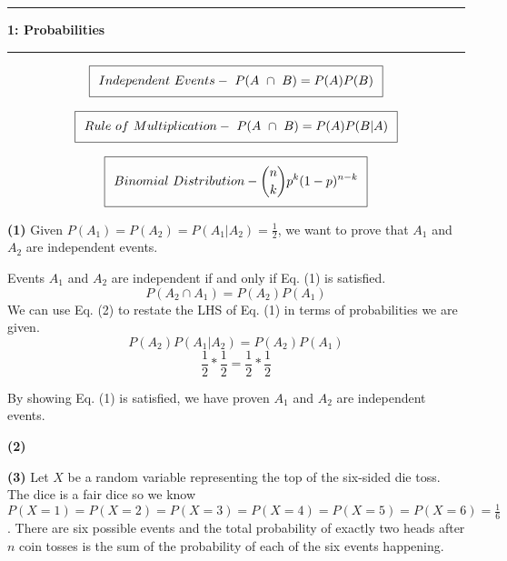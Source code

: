 \documentclass[11pt]{article}
\newcommand\question[2]{\vspace{.25in}\hrule\textbf{#1: #2}\vspace{.5em}\hrule\vspace{.10in}}
\renewcommand\part[1]{\vspace{.10in}\textbf{(#1)}}
\begin{document}
\raggedright
\newcommand\NAME{Jake Pitkin}  %
\newcommand\UID{u0891770}     %
\newcommand\HWNUM{6}              %

\question{1}{Probabilities}

\begin{equation}
\setlength\fboxsep{0.25cm}
\setlength\fboxrule{0.4pt}
\boxed{Independent \ Events- \ P(A \ \cap \ B) = P(A)P(B)}
\end{equation} 

\begin{equation}
\setlength\fboxsep{0.25cm}
\setlength\fboxrule{0.4pt}
\boxed{Rule \ of \ Multiplication- \ P(A \ \cap \ B) = P(A)P(B | A)}
\end{equation} 

\begin{equation}
\setlength\fboxsep{0.25cm}
\setlength\fboxrule{0.4pt}
\boxed{Binomial \ Distribution-  {n \choose k}p^k(1-p)^{n-k}}
\end{equation} 

\part{1} Given $P(A_1) = P(A_2) = P(A_1 | A_2) = \frac{1}{2}$, we want to prove that $A_1$ and $A_2$ are independent events.

Events $A_1$ and $A_2$ are independent if and only if Eq. (1) is satisfied.
$$P(A_2 \cap A_1) = P(A_2)P(A_1)$$
 We can use Eq. (2) to restate the LHS of Eq. (1) in terms of probabilities we are given.
$$P(A_2)P(A_1 | A_2) = P(A_2)P(A_1)$$
$$\frac{1}{2} * \frac{1}{2} = \frac{1}{2} * \frac{1}{2}$$

By showing Eq. (1) is satisfied, we have proven $A_1$ and $A_2$ are independent events.

\part{2}

\part{3} Let $X$ be a random variable representing the top of the six-sided die toss. The dice is a fair dice so we know $P(X=1) = P(X=2) = P(X=3) = P(X=4) = P(X=5) = P(X=6) = \frac{1}{6}$. There are six possible events and the total probability of exactly two heads after $n$ coin tosses is the sum of the probability of each of the six events happening. 
\end{document}
